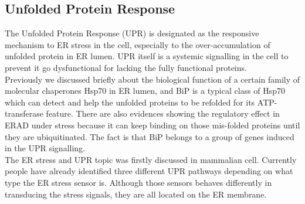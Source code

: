 \subsection{Unfolded Protein Response}
The Unfolded Protein Response (UPR) is designated as the responsive mechanism to ER stress in the cell, especially to the over-accumulation of unfolded protein in ER lumen. UPR itself is a systemic signalling in the cell to prevent it go dysfunctional for lacking the fully functional proteins.\\
Previously we discussed briefly about the biological function of a certain family of molecular chaperones Hsp70 in ER lumen, and BiP is a typical class of Hsp70 which can detect and help the unfolded proteins to be refolded for its ATP-transferase feature. There are also evidences showing the regulatory effect in ERAD under stress because it can keep binding on those mis-folded proteins until they are ubiquitinated. The fact is that BiP belongs to a group of genes induced in the UPR signalling. \\
The ER stress and UPR topic was firstly discussed in mammalian cell. Currently people have already identified three different UPR pathways depending on what type the ER stress sensor is. Although those sensors behaves differently in transducing the stress signals, they are all located on the ER membrane.\\
